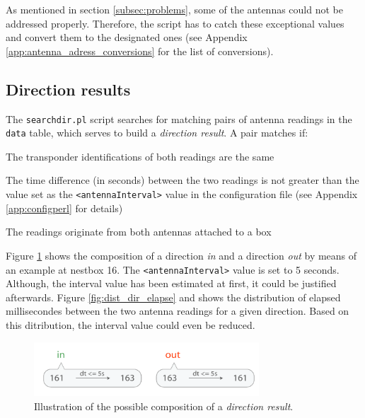 As mentioned in section \ref{subsec:problems}, some of the antennas could not be addressed properly. Therefore, the script has to catch these exceptional values and convert them to the designated ones (see Appendix \ref{app:antenna_adress_conversions} for the list of conversions).

\subsection{Direction results}
\label{subsec:dirres}

The \lstinline|searchdir.pl| script searches for matching pairs of antenna readings in the \lstinline|data| table, which serves to build a \textit{direction result}. A pair matches if:

\begin{mylist}
\item The transponder identifications of both readings are the same
\item The time difference (in seconds) between the two readings is not greater than the value set as the \lstinline|<antennaInterval>| value in the configuration file (see Appendix \ref{app:configperl} for details) 
\item The readings originate from both antennas attached to a box
\end{mylist}

Figure \ref{fig:direction_result} shows the composition of a direction \textit{in} and a direction \textit{out} by means of an example at nestbox 16. The \lstinline|<antennaInterval>| value is set to 5 seconds. Although, the interval value has been estimated at first, it could be justified afterwards. Figure \ref{fig:dist_dir_elapse} and shows the distribution of elapsed millisecondes between the two antenna readings for a given direction. Based on this ditribution, the interval value could even be reduced.
\begin{figure}[htpb]
\begin{center}
  \includegraphics[width=0.75\textwidth]{assets/pdf/direction_result_schema.pdf}
  \caption[Illustration of a direction result]{Illustration of the possible composition of a \textit{direction result}.}
  \label{fig:direction_result}
\end{center}
\end{figure}

